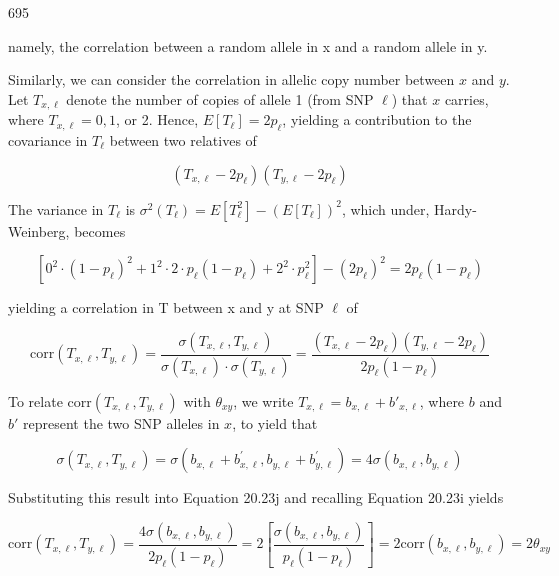 \documentclass{article}
\begin{document}
695

namely, the correlation between a random allele in x and a random allele in y.

Similarly, we can consider the correlation in allelic copy number between $x$ and $y$. Let $T_{x,\ell}$ denote the number of copies of allele 1 (from SNP $\ell$) that $x$ carries, where $T_{x,\ell}=0,1$, or 2. Hence, $E[T_{\ell}]=2p_{\ell}$, yielding a contribution to the covariance in $T_{\ell}$ between two relatives of

\begin{equation}
\left(T_{x,\ell}-2p_{\ell}\right)\left(T_{y,\ell}-2p_{\ell}\right)
\end{equation}

The variance in  $ T_\ell $ is  $ \sigma^2(T_\ell) = E[T_\ell^2] - (E[T_\ell])^2 $, which under, Hardy-Weinberg, becomes

\begin{equation}
\left[0^{2}\cdot(1-p_{\ell})^{2}+1^{2}\cdot2\cdot p_{\ell}(1-p_{\ell})+2^{2}\cdot p_{\ell}^{2}\right]-(2p_{\ell})^{2}=2p_{\ell}(1-p_{\ell})
\end{equation}

yielding a correlation in T between x and y at SNP  $ \ell $ of

\begin{equation}
\mathrm{corr}(T_{x,\ell},T_{y,\ell})=\frac{\sigma(T_{x,\ell},T_{y,\ell})}{\sigma(T_{x,\ell})\cdot\sigma(T_{y,\ell})}=\frac{(T_{x,\ell}-2p_{\ell})\left(T_{y,\ell}-2p_{\ell}\right)}{2p_{\ell}(1-p_{\ell})}
\tag{20.23j}
\label{eq:20_23j}
\end{equation}

To relate  $ \text{corr}(T_{x,\ell}, T_{y,\ell}) $ with  $ \theta_{xy} $, we write  $ T_{x,\ell} = b_{x,\ell} + b'_{x,\ell} $, where  $ b $ and  $ b' $ represent the two SNP alleles in  $ x $, to yield that

\begin{equation}
\sigma(T_{x,\ell},T_{y,\ell})=\sigma(b_{x,\ell}+b_{x,\ell}^{\prime},b_{y,\ell}+b_{y,\ell}^{\prime})=4\sigma(b_{x,\ell},b_{y,\ell})
\end{equation}

Substituting this result into Equation 20.23j and recalling Equation 20.23i yields

\begin{equation}
\mathrm{corr}(T_{x,\ell},T_{y,\ell})=\frac{4\sigma(b_{x,\ell},b_{y,\ell})}{2p_{\ell}(1-p_{\ell})}=2\left[\frac{\sigma(b_{x,\ell},b_{y,\ell})}{p_{\ell}(1-p_{\ell})}\right]=2\mathrm{corr}(b_{x,\ell},b_{y,\ell})=2\theta_{xy}
\tag{20.23k}
\label{eq:20_23k}
\end{equation}
\end{document}
